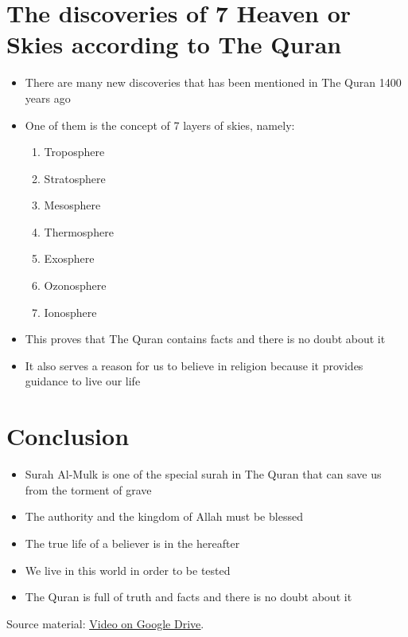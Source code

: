 \documentclass[12pt,titlepage]{article}
\begin{document}
\section{The discoveries of 7 Heaven or Skies according to The Quran}
\begin{itemize}
    \item There are many new discoveries that has been mentioned in The Quran 1400 years ago
    \item {
        One of them is the concept of 7 layers of skies, namely:
        \begin{enumerate}
            \item Troposphere
            \item Stratosphere
            \item Mesosphere
            \item Thermosphere
            \item Exosphere
            \item Ozonosphere
            \item Ionosphere
        \end{enumerate}
    }
    \item This proves that The Quran contains facts and there is no doubt about it
    \item It also serves a reason for us to believe in religion because it provides guidance to live our life
\end{itemize}

\pagebreak

\section{Conclusion}
\begin{itemize}
    \item Surah Al-Mulk is one of the special surah in The Quran that can save us from the torment of grave
    \item The authority and the kingdom of Allah must be blessed
    \item The true life of a believer is in the hereafter
    \item We live in this world in order to be tested
    \item The Quran is full of truth and facts and there is no doubt about it
\end{itemize}

\hspace{2cm}

Source material: \underline{\href{https://drive.google.com/file/d/1_QuDzzcJptFiAH-yyABbWV-5_B8Z4_oW/view}{Video on Google Drive}}.
\end{document}
